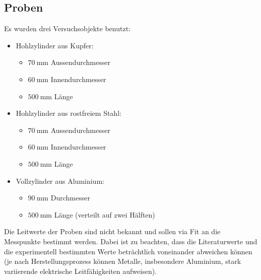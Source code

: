 \subsection{Proben}
\label{sec:durchf:subsec:proben}


Es wurden drei Versuchsobjekte benutzt:
\begin{itemize}
    \item
        Hohlzylinder aus Kupfer:
        \begin{itemize}
            \item
                $\SI{70}{\milli\meter}$ Aussendurchmesser
            \item
                $\SI{60}{\milli\meter}$ Innendurchmesser
            \item
                $\SI{500}{\milli\meter}$ L\"ange
        \end{itemize}
    \item
        Hohlzylinder aus rostfreiem Stahl:
        \begin{itemize}
            \item
                $\SI{70}{\milli\meter}$ Aussendurchmesser
            \item
                $\SI{60}{\milli\meter}$ Innendurchmesser
            \item
                $\SI{500}{\milli\meter}$ L\"ange
        \end{itemize}
    \item
        Vollzylinder aus Aluminium:
        \begin{itemize}
            \item
                $\SI{90}{\milli\meter}$ Durchmesser
            \item
                $\SI{500}{\milli\meter}$ L\"ange (verteilt auf zwei H\"alften)
        \end{itemize}
\end{itemize}


Die  Leitwerte  der Proben  sind  nicht  bekannt und  sollen  via  Fit an  die
Messpunkte  bestimmt werden. Dabei  ist zu  beachten, dass  die Literaturwerte
und die  experimentell bestimmten  Werte betr\"achtlich  voneinander abweichen
k\"onnen   (je  nach   Herstellungsprozess   k\"onnen  Metalle,   insbesondere
Aluminium, stark variierende elektrische Leitf\"ahigkeiten aufweisen).


